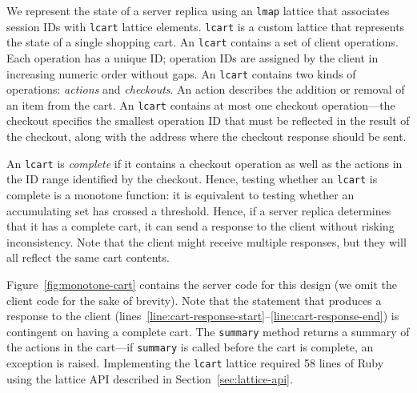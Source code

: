 
We represent the state of a server replica using an \texttt{lmap} lattice that
associates session IDs with \texttt{lcart} lattice elements. \texttt{lcart} is a
custom lattice that represents the state of a single shopping cart. An
\texttt{lcart} contains a set of client operations. Each operation has a unique
ID; operation IDs are assigned by the client in increasing numeric order without
gaps. An \texttt{lcart} contains two kinds of operations: \emph{actions} and
\emph{checkouts}. An action describes the addition or removal of an item from
the cart. An \texttt{lcart} contains at most one checkout operation---the
checkout specifies the smallest operation ID that must be reflected in the
result of the checkout, along with the address where the checkout response
should be sent.

An \texttt{lcart} is \emph{complete} if it contains a checkout operation as well
as the actions in the ID range identified by the checkout. Hence, testing
whether an \texttt{lcart} is complete is a monotone function: it is equivalent
to testing whether an accumulating set has crossed a threshold. Hence, if a
server replica determines that it has a complete cart, it can send a response to
the client without risking inconsistency. Note that the client might receive
multiple responses, but they will all reflect the same cart contents.

Figure~\ref{fig:monotone-cart} contains the server code for this design (we omit
the client code for the sake of brevity). Note that the statement that produces
a response to the client
(lines~\ref{line:cart-response-start}--\ref{line:cart-response-end}) is
contingent on having a complete cart. The \texttt{summary} method returns a
summary of the actions in the cart---if \texttt{summary} is called before the
cart is complete, an exception is raised. Implementing the \texttt{lcart}
lattice required 58 lines of Ruby using the lattice API described in
Section~\ref{sec:lattice-api}.

